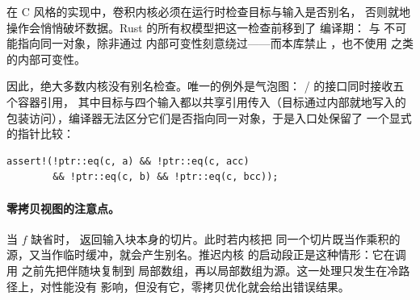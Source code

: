 在 C 风格的实现中，卷积内核必须在运行时检查目标与输入是否别名，
否则就地操作会悄悄破坏数据。Rust 的所有权模型把这一检查前移到了
编译期： 与  不可能指向同一对象，除非通过
内部可变性刻意绕过——而本库禁止 ，也不使用
 之类的内部可变性。

因此，绝大多数内核没有别名检查。唯一的例外是气泡图：
/ 的接口同时接收五个容器引用，
其中目标与四个输入都以共享引用传入（目标通过内部就地写入的
包装访问），编译器无法区分它们是否指向同一对象，于是入口处保留了
一个显式的指针比较：
\begin{lstlisting}[numbers=none]
assert!(!ptr::eq(c, a) && !ptr::eq(c, acc)
        && !ptr::eq(c, b) && !ptr::eq(c, bcc));
\end{lstlisting}

\paragraph{零拷贝视图的注意点。}
当 $f$ 缺省时， 返回输入块本身的切片。此时若内核把
同一个切片既当作乘积的源，又当作临时缓冲，就会产生别名。推迟内核
的启动段正是这种情形：它在调用  之前先把伴随块复制到
局部数组，再以局部数组为源。这一处理只发生在冷路径上，对性能没有
影响，但没有它，零拷贝优化就会给出错误结果。
